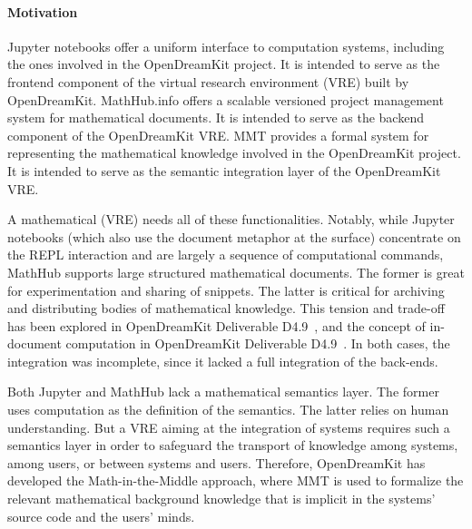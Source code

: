\paragraph{Motivation}
Jupyter notebooks offer a uniform interface to computation systems, including the ones involved in the OpenDreamKit project.
It is intended to serve as the frontend component of the virtual research environment (VRE) built by OpenDreamKit.
MathHub.info offers a scalable versioned project management system for mathematical documents.
It is intended to serve as the backend component of the OpenDreamKit VRE.
MMT provides a formal system for representing the mathematical knowledge involved in the OpenDreamKit project.
It is intended to serve as the semantic integration layer of the OpenDreamKit VRE.

A mathematical (VRE) needs all of these functionalities.
Notably, while Jupyter notebooks (which also use the document metaphor at the surface) concentrate on the REPL interaction and are largely a sequence of computational commands, MathHub supports large structured mathematical documents.
The former is great for experimentation and sharing of snippets. The latter is critical for archiving and distributing bodies of mathematical knowledge.
This tension and trade-off has been explored in OpenDreamKit Deliverable D4.9~\cite{ODK-D4.2}, and the concept of in-document computation in OpenDreamKit Deliverable D4.9~\cite{ODK-D4.9}.
In both cases, the integration was incomplete, since it lacked a full integration of the back-ends.

Both Jupyter and MathHub lack a mathematical semantics layer.
The former uses computation as the definition of the semantics.
The latter relies on human understanding.
But a VRE aiming at the integration of systems requires such a semantics layer in order to safeguard the transport of knowledge among systems, among users, or between systems and users.
Therefore, OpenDreamKit has developed the Math-in-the-Middle approach, where MMT is used to formalize the relevant mathematical background knowledge that is implicit in the systems' source code and the users' minds.

